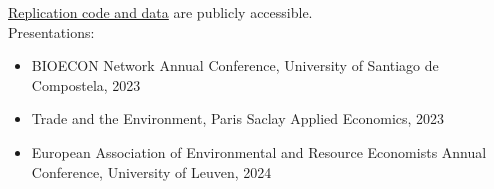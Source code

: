 \href{https://github.com/julawson/conservation_farming_totoaba}{Replication code and data} are publicly accessible.
%
\\
Presentations:
\begin{itemize}
\item BIOECON Network Annual Conference, University of Santiago de Compostela, 2023
\item Trade and the Environment, Paris Saclay Applied Economics, 2023
\item European Association of Environmental and Resource Economists Annual Conference, University of Leuven, 2024
\end{itemize}
%

\clearpage
{\footnotesize


}
\cleardoublepage






